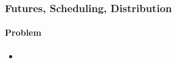 \begin{frame}

\frametitle{Futures, Scheduling, Distribution}
\framesubtitle{Problem}
\begin{itemize}
\item 
\end{itemize}

\end{frame}